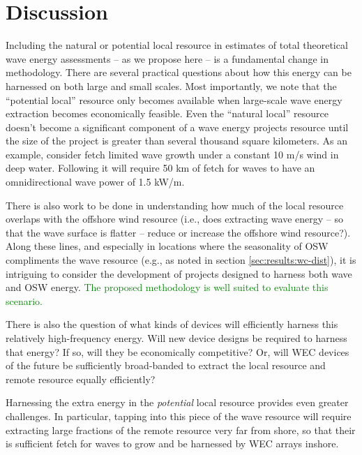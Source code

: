 \section{Discussion} \label{sec:discussion}

Including the natural or potential local resource in estimates of total theoretical wave energy assessments -- as we propose here -- is a fundamental change in methodology. There are several practical questions about how this energy can be harnessed on both large and small scales. 
Most importantly, we note that the ``potential local'' resource only becomes available when large-scale wave energy extraction becomes economically feasible. Even the ``natural local'' resource doesn't become a significant component of a wave energy projects resource until the size of the project is greater than several thousand square kilometers. As an example, consider fetch limited wave growth under a constant 10 m/s wind in deep water. Following \citet{donelan1980similarity} it will require 50 km of fetch for waves to have an omnidirectional wave power of 1.5 kW/m. 

There is also work to be done in understanding how much of the local resource overlaps with the offshore wind resource (i.e., does extracting wave energy -- so that the wave surface is flatter -- reduce or increase the offshore wind resource?). Along these lines, and especially in locations where the seasonality of OSW compliments the wave resource (e.g., as noted in section \ref{sec:results:wc-dist}), it is intriguing to consider the development of projects designed to harness both wave and OSW energy. \textcolor{green}{The proposed methodology is well suited to evaluate this scenario.}

There is also the question of what kinds of devices will efficiently harness this relatively high-frequency energy. Will new device designs be required to harness that energy? If so, will they be economically competitive? Or, will WEC devices of the future be sufficiently broad-banded to extract the local resource and remote resource equally efficiently? 

Harnessing the extra energy in the {\em potential} local resource provides even greater challenges. In particular, tapping into this piece of the wave resource will require extracting large fractions of the remote resource very far from shore, so that their is sufficient fetch for waves to grow and be harnessed by WEC arrays inshore.  

